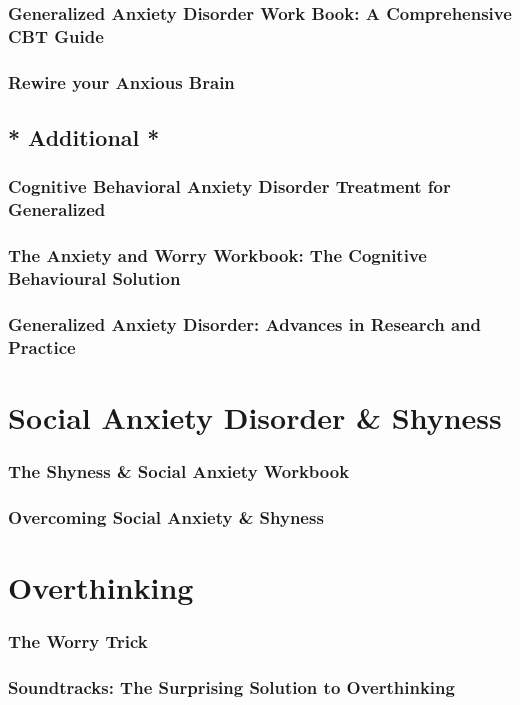 \documentclass[12pt, a4paper]{article}
\newcommand{\nl}{\vspace{\baselineskip}}
\begin{document}
\subsubsection*{Generalized Anxiety Disorder Work Book: A Comprehensive CBT Guide}
\subsubsection*{Rewire your Anxious Brain}\nl
\subsection*{* Additional *}
\subsubsection*{Cognitive Behavioral Anxiety Disorder Treatment for Generalized}
\subsubsection*{The Anxiety and Worry Workbook: The Cognitive Behavioural Solution}
\subsubsection*{Generalized Anxiety Disorder: Advances in Research and Practice}\nl

\section*{Social Anxiety Disorder \& Shyness}
\subsubsection*{The Shyness \& Social Anxiety Workbook}
\subsubsection*{Overcoming Social Anxiety \& Shyness}\nl

\newpage

\section*{Overthinking}
\subsubsection*{The Worry Trick}
\subsubsection*{Soundtracks: The Surprising Solution to Overthinking}\nl
\end{document}
